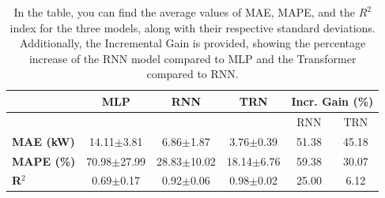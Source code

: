 \begin{table}[H]
	\centering
	\begin{tabular}{l|c|c|c|c|c}

		                   & \textbf{MLP}    & \textbf{RNN}    & \textbf{TRN}   & \multicolumn{2}{c}{\textbf{Incr. Gain (\%)}}         \\
		\hline
		                   &                 &                 &                & RNN                                          & TRN   \\
		\cline{5-6}
		\textbf{MAE (kW)}  & 14.11$\pm$3.81  & 6.86$\pm$1.87   & 3.76$\pm 0.39$ & 51.38                                        & 45.18 \\
		\textbf{MAPE (\%)} & 70.98$\pm$27.99 & 28.83$\pm$10.02 & 18.14$\pm$6.76 & 59.38                                        & 30.07 \\
		\textbf{R$^2$}     & 0.69$\pm$0.17   & 0.92$\pm$0.06   & 0.98$\pm$0.02  & 25.00                                        & 6.12

	\end{tabular}
	\caption{In the table, you can find the average values of MAE, MAPE, and the $R^2$ index for the three models, along with their respective standard deviations. Additionally, the Incremental Gain is provided, showing the percentage increase of the RNN model compared to MLP and the Transformer compared to RNN.}
	\label{tab:comglobalmetrics3modelli}
\end{table}


